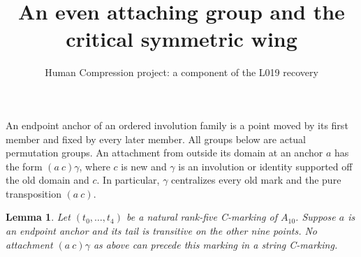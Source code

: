 \documentclass[11pt,a4paper]{article}
\title{An even attaching group and the critical symmetric wing}
\author{Human Compression project: a component of the L019 recovery}
\date{}
\newtheorem{lemma}{Lemma}
\begin{document}
\maketitle
An endpoint anchor of an ordered involution family is a point moved by
its first member and fixed by every later member. All groups below are
actual permutation groups. An attachment from outside its domain at
an anchor $a$ has the form $(a\ c)\gamma$, where $c$ is new and
$\gamma$ is an involution or identity supported off the old domain
and $c$. In particular, $\gamma$ centralizes every old mark and the
pure transposition $(a\ c)$.

\begin{lemma}\label{ten}
Let $(t_0,\ldots,t_4)$ be a natural rank-five C-marking of $A_{10}$.
Suppose $a$ is an endpoint anchor and its tail is transitive on the
other nine points. No attachment $(a\ c)\gamma$ as above can precede
this marking in a string C-marking.
\end{lemma}
\end{document}
